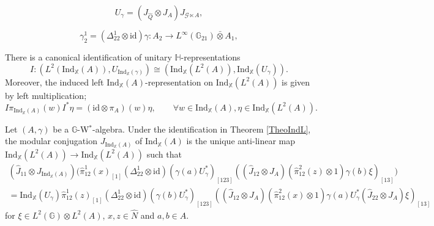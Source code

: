 \documentclass[10pt,a4paper]{amsart}
\newcommand{\G}{\mathbb{G}}
\newcommand{\Hh}{\mathbb{H}}
\newcommand{\Ind}{\mathrm{Ind}}
\newcommand{\X}{\mathbb{X}}
\newcommand{\id}{\mathrm{id}}
\newcommand{\msG}{\mathscr{G}}
\begin{document}
\begin{equation}\label{EqIsometImpl}
U_{\gamma} = (J_{\hat{Q}}\otimes J_A)J_{\msG \ltimes A},
\end{equation}

\begin{equation}\label{eq50}
\gamma_2^1 =(\Delta_{22}^1\otimes \id) \gamma\colon A_2 \rightarrow L^{\infty}(\G_{21})\bar{\otimes} A_1,
\end{equation}

\begin{Theorem}\label{TheoIndL}
There is a canonical identification of unitary $\Hh$-representations
\[
I\colon (L^2(\Ind_{\X}(A)),U_{\Ind_{\X}(\gamma)}) \cong (\Ind_{\X}(L^2(A)),\Ind_{\X}(U_{\gamma})).
\]
Moreover, the induced left $\Ind_{\X}(A)$-representation on $\Ind_{\X}(L^2(A))$ is given by left multiplication;
\[
I\pi_{\Ind_{\X}(A)}(w)I^* \eta = (\id\otimes \pi_A)(w)\eta,\qquad \forall w\in \Ind_{\X}(A), \eta\in \Ind_{\X}(L^2(A)).  
\]
\end{Theorem}

\begin{Lem}\label{LemIndLModConj}
Let $(A,\gamma)$ be a $\G$-W$^*$-algebra. Under the identification in Theorem \ref{TheoIndL}, the modular conjugation $J_{\Ind_{\X}(A)}$ of $\Ind_{\X}(A)$ is the unique anti-linear map $\Ind_{\X}(L^2(A))\rightarrow \Ind_{\X}(L^2(A))$ such that 
\begin{multline}\label{EqFormModConj}
(\hat{J}_{11}\otimes J_{\Ind_{\X}(A)})
\bigl(
\hat{\pi}_{12}^1(x)_{[1]}
(\Delta_{22}^1\otimes \id)(\gamma(a)U_{\gamma}^*)_{[123]}
((\hat{J}_{12}\otimes J_A)(\hat{\pi}_{12}^2(z)\otimes 1)\gamma(b)\xi)_{[13]}\bigr) \\
=
\Ind_{\X}(U_{\gamma})
\hat{\pi}_{12}^1(z)_{[1]}
(\Delta_{22}^1\otimes \id)(\gamma(b)U_{\gamma}^*)_{[123]}
((\hat{J}_{12}\otimes J_A)(\hat{\pi}_{12}^2(x)\otimes 1)\gamma(a)U_\gamma^* (\hat{J}_{22}\otimes J_A)\xi)_{[13]}
\end{multline}
for $\xi\in L^2(\G)\otimes L^2(A)$, $x,z\in \hat{N}$ and $a,b\in A$. 
\end{Lem}
\end{document}

